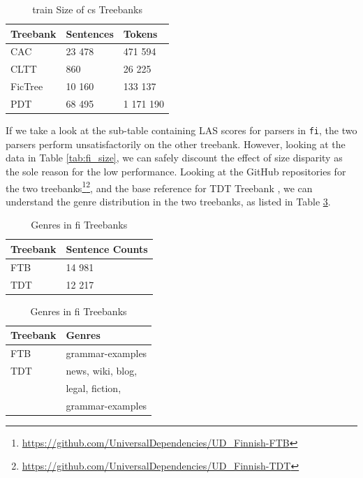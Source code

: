 \begin{table}[H]
    \centering
    \begin{tabular}{l|l|l|}
        Treebank & Sentences & Tokens\\
        \hline
        CAC & 23 478 & 471 594\\
        CLTT & 860 & 26 225\\
        FicTree & 10 160 & 133 137\\
        PDT & 68 495 & 1 171 190\\
    \end{tabular}%
    \caption{train Size of cs Treebanks}
    \label{tab:cs_size}
\end{table}
    
If we take a look at the sub-table containing LAS scores for parsers in \verb|fi|, the two parsers perform unsatisfactorily on the other treebank. However, looking at the data in Table \ref{tab:fi_size}, we can safely discount the effect of size disparity as the sole reason for the low performance. Looking at the GitHub repositories for the two treebanks\footnote{\url{https://github.com/UniversalDependencies/UD_Finnish-FTB}}\footnote{\url{https://github.com/UniversalDependencies/UD_Finnish-TDT}}, and the base reference for TDT Treebank \citep{Haverinen2014}, we can understand the genre distribution in the two treebanks, as listed in Table \ref{tab:fi_genera}.

\begin{table}[H]
    \begin{minipage}{0.4\linewidth}
    \begin{tabular}{l|l}
        Treebank & Sentence Counts \\
        \hline
        FTB & 14 981 \\
        TDT & 12 217 \\
    \end{tabular}%
    \caption{train Size of fi Treebanks}
    \label{tab:fi_size}
    \end{minipage}%
    \quad
    \begin{minipage}{0.5\linewidth}
    \begin{tabular}{l|l}
        Treebank & Genres \\
        \hline
        FTB & grammar-examples \\
        TDT & news, wiki, blog, \\
        & legal, fiction, \\
        & grammar-examples \\
    \end{tabular}%
    \caption{Genres in fi Treebanks}
    \label{tab:fi_genera}
    \end{minipage}
\end{table}

